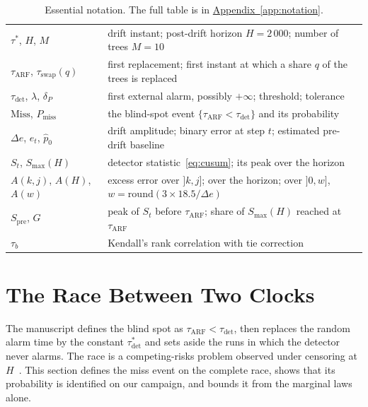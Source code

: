 \documentclass[10pt,conference]{IEEEtran}
\theoremstyle{definition}
\begin{document}
\begin{table}[h]
\centering
\caption{Essential notation. The full table is in \hyperref[app:notation]{Appendix~\ref*{app:notation}}.}
\label{tab:notation-courte}
\small
\begin{tabular}{@{}ll@{}}
\toprule
$\tau^*$, $H$, $M$ & drift instant; post-drift horizon $H = 2\,000$; number of trees $M = 10$ \\
$\tau_{\mathrm{ARF}}$, $\tau_{\mathrm{swap}}(q)$ & first replacement; first instant at which a share $q$ of the trees is replaced \\
$\tau_{\mathrm{det}}$, $\lambda$, $\delta_P$ & first external alarm, possibly $+\infty$; threshold; tolerance \\
$\mathrm{Miss}$, $P_{\mathrm{miss}}$ & the blind-spot event $\{\tau_{\mathrm{ARF}} < \tau_{\mathrm{det}}\}$ and its probability \\
$\Delta e$, $e_t$, $\hat p_0$ & drift amplitude; binary error at step $t$; estimated pre-drift baseline \\
$S_t$, $S_{\max}(H)$ & detector statistic~\eqref{eq:cusum}; its peak over the horizon \\
$A(k,j)$, $A(H)$, $A(w)$ & excess error over $]k,j]$; over the horizon; over $]0,w]$, $w = \mathrm{round}(3 \times 18.5/\Delta e)$ \\
$S_{\mathrm{pre}}$, $G$ & peak of $S_t$ before $\tau_{\mathrm{ARF}}$; share of $S_{\max}(H)$ reached at $\tau_{\mathrm{ARF}}$ \\
$\tau_b$ & Kendall's rank correlation with tie correction \\
\bottomrule
\end{tabular}
\end{table}

\newpage
\twocolumn

\section{The Race Between Two Clocks}
\label{sec:A}

The manuscript defines the blind spot as $\tau_{\mathrm{ARF}} < \tau_{\mathrm{det}}$, then
replaces the random alarm time by the constant $\tau^*_{\mathrm{det}}$ and sets aside the
runs in which the detector never alarms. The race is a competing-risks problem observed
under censoring at $H$~\cite{fine1999,aalen1978}. This section defines the miss event on
the complete race, shows that its probability is identified on our campaign, and bounds it
from the marginal laws alone.
\end{document}
